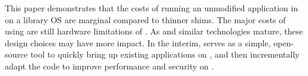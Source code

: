 
This paper demonstrates that the costs of running an unmodified application in \sgx{} on a library OS are
marginal compared to thinner shims.
The major costs of using \sgx{} are still hardware limitations of \sgx{}.
As \sgx{} and similar technologies mature, these design choices may have more impact.
In the interim, \sysname{} serves as a simple, open-source tool to quickly bring up
existing applications on \sgx{}, and then incrementally adapt the code to improve performance and security on \sgx{}.

